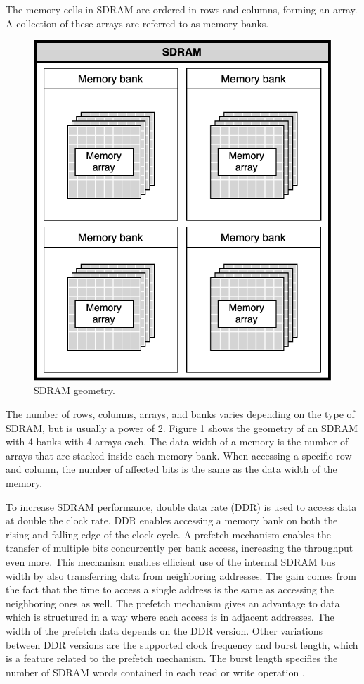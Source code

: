 \documentclass[12pt]{report}
\begin{document}
The memory cells in SDRAM are ordered in rows and columns, forming an array. A collection of these arrays are referred to as memory banks. 
\begin{figure}
    \includegraphics[scale=0.3]{figures/sdram_bank_array.png}
    \caption{SDRAM geometry.}
    \label{fig:8}
\end{figure}
The number of rows, columns, arrays, and banks varies depending on the type of SDRAM, but is usually a power of 2. Figure \ref{fig:8} shows the geometry of an SDRAM with 4 banks with 4 arrays each. The data width of a memory is the number of arrays that are stacked inside each memory bank. When accessing a specific row and column, the number of affected bits is the same as the data width of the memory.
\par
To increase SDRAM performance, double data rate (DDR) is used to access data at double the clock rate. DDR enables accessing a memory bank on both the rising and falling edge of the clock cycle. A prefetch mechanism enables the transfer of multiple bits concurrently per bank access, increasing the throughput even more. This mechanism enables efficient use of the internal SDRAM bus width by also transferring data from neighboring addresses. The gain comes from the fact that the time to access a single address is the same as accessing the neighboring ones as well. The prefetch mechanism gives an advantage to data which is structured in a way where each access is in adjacent addresses. The width of the prefetch data depends on the DDR version. Other variations between DDR versions are the supported clock frequency and burst length, which is a feature related to the prefetch mechanism. The burst length specifies the number of SDRAM words contained in each read or write operation \citep{MicronSDRAMGeneral}.
\end{document}
